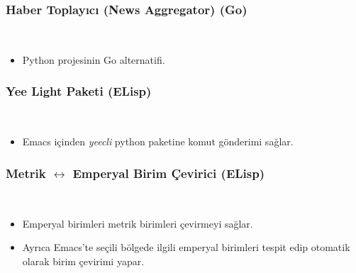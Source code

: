 \documentclass[a4paper, 9pt]{extarticle}
\begin{document}
\subsubsection{Haber Toplayıcı (News Aggregator) (Go)} \hfill \\
\vspace{-1.9em} \begin{itemize}
    \itemsep-0.7em
    \item Python projesinin Go alternatifi.
\end{itemize}

\subsubsection{Yee Light Paketi (ELisp)} \hfill \\
\vspace{-1.9em}\begin{itemize}
    \itemsep-0.7em
    \item Emacs içinden \emph{yeecli} python paketine komut gönderimi sağlar.
\end{itemize}

\subsubsection{Metrik $\longleftrightarrow$ Emperyal Birim Çevirici (ELisp)} \hfill \\
\vspace{-1.9em}\begin{itemize}
    \itemsep-0.7em
    \item Emperyal birimleri metrik birimleri çevirmeyi sağlar.
    \item Ayrıca Emacs'te seçili bölgede ilgili emperyal birimleri tespit edip otomatik olarak birim çevirimi yapar.
\end{itemize}

\mydiller{}
\myteknikbecerilerb{}
\myhobilerb{}

\end{document}
